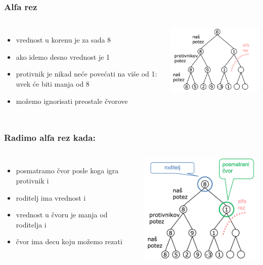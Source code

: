 \documentclass[compress,aspectratio=169]{beamer}
\begin{document}
\begin{frame}[fragile]
  \frametitle{Alfa rez}
  \begin{columns}
    \column{8cm}
    \begin{itemize}
      \item vrednost u korenu je za sada 8
      \item ako idemo desno vrednost je 1
      \item protivnik je nikad neće povećati na više od 1: uvek će biti manja od 8
      \item možemo ignorisati preostale čvorove
    \end{itemize}
    \column{8cm}
    \begin{center}
      \includegraphics[width=7cm]{prj-01-pic11.png}
    \end{center}
  \end{columns}
\end{frame}

\begin{frame}[fragile]
  \frametitle{Radimo alfa rez kada:}
  \begin{columns}
    \column{8cm}
    \begin{itemize}
      \item posmatramo čvor posle koga igra protivnik i
      \item roditelj ima vrednost i
      \item vrednost u čvoru je manja od roditelja i
      \item čvor ima decu koju možemo rezati
    \end{itemize}
    \column{8cm}
    \begin{center}
      \includegraphics[width=7cm]{prj-01-pic12.png}
    \end{center}
  \end{columns}
\end{frame}
\end{document}
